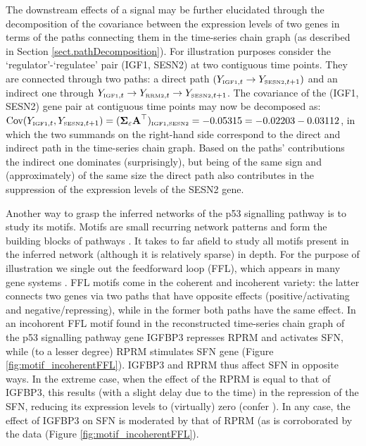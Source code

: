 The downstream effects of a signal may be further elucidated through the decomposition of the covariance between the expression levels of two genes in terms of the paths connecting them in the time-series chain graph (as described in Section \ref{sect.pathDecomposition}). For illustration purposes consider the `regulator'-`regulatee' pair (IGF1, SESN2) at two contiguous time points. They are connected through two paths: a direct path $(Y_{\mbox{{\tiny IGF1}},t} \rightarrow Y_{\mbox{{\tiny SESN2}},t+1})$ and an indirect one through $Y_{\mbox{{\tiny IGF1}},t} \rightarrow Y_{\mbox{{\tiny RRM2}},t}\rightarrow Y_{\mbox{{\tiny SESN2}},t+1}$. The covariance of the (IGF1, SESN2) gene pair at contiguous time points may now be decomposed as: $\mbox{Cov}(Y_{\mbox{{\tiny IGF1}},t},Y_{\mbox{{\tiny SESN2}},t+1}) = (\boldsymbol{\Sigma}_{\varepsilon} \textbf{A}^\top)_{\mbox{{\tiny IGF1}}, \mbox{{\tiny SESN2}}} =  -0.05315 = -0.02203  - 0.03112$, in which the two summands on the right-hand side correspond to the direct and indirect path in the time-series chain graph. Based on the paths' contributions the indirect one dominates (surprisingly), but being of the same sign and (approximately) of the same size the direct path also contributes in the suppression of the expression levels of the SESN2 gene.


Another way to grasp the inferred networks of the p53 signalling pathway is to study its motifs. Motifs are small recurring network patterns and form the building blocks of pathways \cite{Alon2007}. It takes to far afield to study all motifs present in the inferred network (although it is relatively sparse) in depth. For the purpose of illustration we single out the feedforward loop (FFL), which appears in many gene systems \cite{Alon2007}. FFL motifs come in the coherent and incoherent variety: the latter connects two genes via two paths that have opposite effects (positive/activating and negative/repressing), while in the former both paths have the same effect. In an incohorent FFL motif found in the reconstructed time-series chain graph of the p53 signalling pathway gene IGFBP3 represses RPRM and activates SFN, while (to a lesser degree) RPRM stimulates SFN gene (Figure \ref{fig:motif_incoherentFFL}). IGFBP3 and RPRM thus affect SFN in opposite ways. In the extreme case, when the effect of the RPRM is equal to that of IGFBP3, this results (with a slight delay due to the time) in the repression of the SFN, reducing its expression levels to (virtually) zero (confer \cite{Alon2007}). In any case, the effect of IGFBP3 on SFN is moderated by that of RPRM (as is corroborated by the data (Figure \ref{fig:motif_incoherentFFL}).


